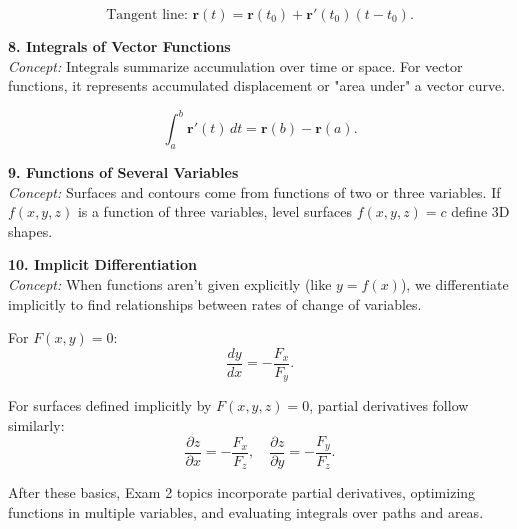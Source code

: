 \documentclass[9pt]{article}
\begin{document}
\begin{multicols}{2}
\begin{tcolorbox}[title=, colframe=brightpink]
\[
\text{Tangent line: } \mathbf{r}(t)=\mathbf{r}(t_0)+\mathbf{r}'(t_0)(t-t_0).
\]
\end{tcolorbox}

\begin{tcolorbox}[title=, colframe=brightyellow]
\textbf{8. Integrals of Vector Functions}\\
\textit{Concept:} Integrals summarize accumulation over time or space. For vector functions, it represents accumulated displacement or "area under" a vector curve.

\[
\int_a^b \mathbf{r}'(t)\,dt=\mathbf{r}(b)-\mathbf{r}(a).
\]
\end{tcolorbox}

\begin{tcolorbox}[title=, colframe=brightblue]
\textbf{9. Functions of Several Variables}\\
\textit{Concept:} Surfaces and contours come from functions of two or three variables. If $f(x,y,z)$ is a function of three variables, level surfaces $f(x,y,z)=c$ define 3D shapes.
\end{tcolorbox}

\begin{tcolorbox}[title=, colframe=brightgreen]
\textbf{10. Implicit Differentiation}\\
\textit{Concept:} When functions aren't given explicitly (like $y=f(x)$), we differentiate implicitly to find relationships between rates of change of variables.

For $F(x,y)=0$:
\[
\frac{dy}{dx} = -\frac{F_x}{F_y}.
\]

For surfaces defined implicitly by $F(x,y,z)=0$, partial derivatives follow similarly:
\[
\frac{\partial z}{\partial x} = -\frac{F_x}{F_z}, \quad \frac{\partial z}{\partial y} = -\frac{F_y}{F_z}.
\]
\end{tcolorbox}

\end{multicols}

\noindent After these basics, Exam 2 topics incorporate partial derivatives, optimizing functions in multiple variables, and evaluating integrals over paths and areas.
\end{document}
